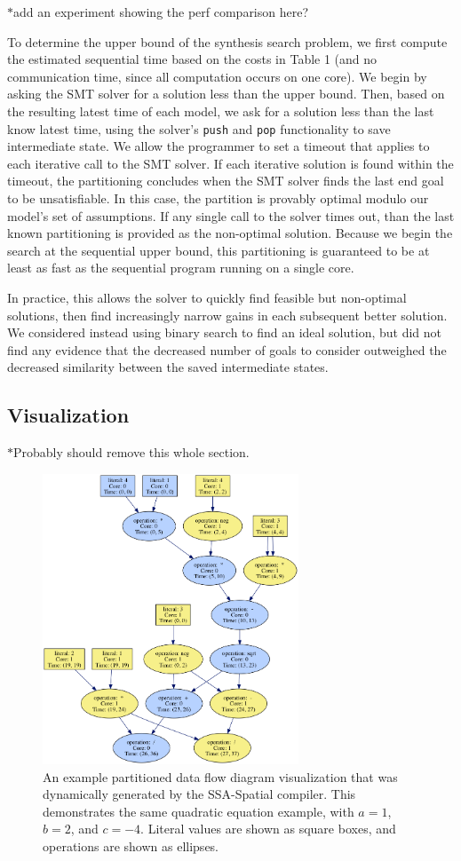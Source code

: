 \documentclass{sig-alternate-05-2015}
\newcommand{\note}{\color{red}$*$}
\begin{document}
{\note add an experiment showing the perf comparison here?}

To determine the upper bound of the synthesis search problem, we first compute the estimated sequential time based on the costs in Table 1 (and no communication time, since all computation occurs on one core). We begin by asking the SMT solver for a solution less than the upper bound. Then, based on the resulting latest time of each model, we ask for a solution less than the last know latest time, using the solver's \texttt{push} and \texttt{pop} functionality to save intermediate state. We allow the programmer to set a timeout that applies to each iterative call to the SMT solver. If each iterative solution is found within the timeout, the partitioning concludes when the SMT solver finds the last end goal to be unsatisfiable. In this case, the partition is provably optimal modulo our model's set of assumptions. If any single call to the solver times out, than the last known partitioning is provided as the non-optimal solution. Because we begin the search at the sequential upper bound, this partitioning is guaranteed to be at least as fast as the sequential program running on a single core. 

In practice, this allows the solver to quickly find feasible but non-optimal solutions, then find increasingly narrow gains in each subsequent better solution. We considered instead using binary search to find an ideal solution, but did not find any evidence that the decreased number of goals to consider outweighed the decreased similarity between the saved intermediate states.

\subsection{Visualization}

{\note Probably should remove this whole section.}

\begin{figure}
\centering
\includegraphics[width=3in]{quadratic-2x2.png}
\caption{An example partitioned data flow diagram visualization that was dynamically generated by the SSA-Spatial compiler. This demonstrates the same quadratic equation example, with $a = 1$, $b = 2$, and $c = -4$. Literal values are shown as square boxes, and operations are shown as ellipses.}
\label{fig:dfg-viz}
\end{figure}
\end{document}
